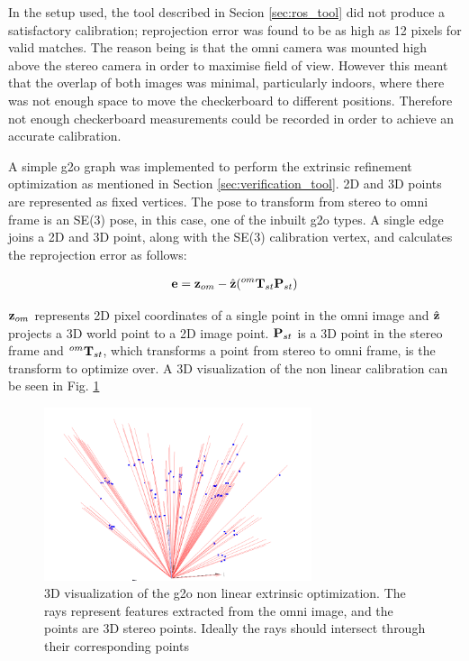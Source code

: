 In the setup used, the tool described in Secion \ref{sec:ros_tool} did not produce a satisfactory calibration; reprojection error was found to be as high as 12 pixels for valid matches.  The reason being is that the omni camera was mounted high above the stereo camera in order to maximise field of view.  However this meant that the overlap of both images was minimal, particularly indoors, where there was not enough space to move the checkerboard to different positions.  Therefore not enough checkerboard measurements could be recorded in order to achieve an accurate calibration.

A simple g2o graph was implemented to perform the extrinsic refinement optimization as mentioned in Section \ref{sec:verification_tool}.  2D and 3D points are represented as fixed vertices.  The pose to transform from stereo to omni frame is an SE(3) pose, in this case, one of the inbuilt g2o types.  A single edge joins a 2D and 3D point, along with the SE(3) calibration vertex, and calculates the reprojection error as follows:

\begin{align}
 \mathbf e = \mathbf z_{om} - \hat{\mathbf z}( ^{om}\mathbf T_{st} \mathbf P_{st})
\end{align}

$\mathbf z_{om}$ represents 2D pixel coordinates of a single point in the omni image and $\hat{\mathbf z}$ projects a 3D world point to a 2D image point.  $\mathbf P_{st}$ is a 3D point in the stereo frame and $^{om}\mathbf T_{st}$, which transforms a point from stereo to omni frame, is the transform to optimize over.  A 3D visualization of the non linear calibration can be seen in Fig. \ref{fig:g2o_cal_vis}


\begin{figure}[h!]
  \centering
    \includegraphics[width=0.7\textwidth]{chapters/images/g2o_cal_vis}
  \caption{3D visualization of the g2o non linear extrinsic optimization.  The rays represent features extracted from the omni image, and the points are 3D stereo points.  Ideally the rays should intersect through their corresponding points}
  \label{fig:g2o_cal_vis}
\end{figure}

